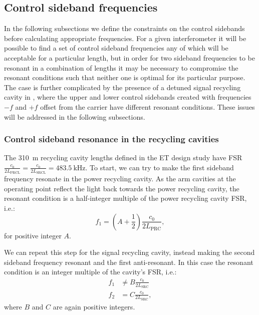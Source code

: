\subsection{\label{sec:control-sideband-freqs}Control sideband frequencies}
In the following subsections we define the constraints on the control sidebands before calculating appropriate frequencies. For a given interferometer it will be possible to find a set of control sideband frequencies any of which will be acceptable for a particular length, but in order for two sideband frequencies to be resonant in a combination of lengths it may be necessary to compromise the resonant conditions such that neither one is optimal for its particular purpose. The case is further complicated by the presence of a detuned signal recycling cavity in \ETLF{}, where the upper and lower control sidebands created with frequencies $-f$ and $+f$ offset from the carrier have different resonant conditions. These issues will be addressed in the following subsections.

\subsubsection{Control sideband resonance in the recycling cavities}
The \SI{310}{\meter} recycling cavity lengths defined in the \gls{ET} design study have \gls{FSR} $\frac{c_0}{2 L_{\text{PRCL}}} = \frac{c_0}{2 L_{\text{SRCL}}} = \SI{483.5}{\kilo\hertz}$. To start, we can try to make the first sideband frequency resonate in the power recycling cavity. As the arm cavities at the operating point reflect the light back towards the power recycling cavity, the resonant condition is a half-integer multiple of the power recycling cavity \gls{FSR}, i.e.:
\begin{equation}
  \label{eq:prc-fsr}
  f_1 = \left(A + \frac{1}{2} \right) \frac{c_0}{2 L_{\text{PRC}}},
\end{equation}
for positive integer $A$.

We can repeat this step for the signal recycling cavity, instead making the second sideband frequency resonant and the first anti-resonant. In this case the resonant condition is an integer multiple of the cavity's \gls{FSR}, i.e.:
\begin{equation}
  \label{eq:src-fsr}
  \begin{split}
    f_1 &\neq B \frac{c_0}{2 L_{\text{SRC}}} \\
    f_2 &= C \frac{c_0}{2 L_{\text{SRC}}},
  \end{split}
\end{equation}
where $B$ and $C$ are again positive integers.

